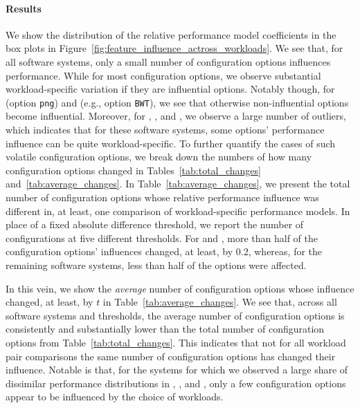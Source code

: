 \paragraph*{Results} 
We show the distribution of the relative performance model coefficients in the box plots in Figure~\ref{fig:feature_influence_actross_workloads}. We see that, for all software systems, only a small number of configuration options influences performance. While for most configuration options, we observe substantial workload-specific variation if they are influential options. Notably though, for \dconvert (option \texttt{png}) and \kanzi (e.g., option \texttt{BWT}), we see that otherwise non-influential options become influential. Moreover, for \batik, \dconvert, and \kanzi, we observe a large number of outliers, which indicates that for these software systems, some options' performance influence can be quite workload-specific.
To further quantify the cases of such volatile configuration options, we break down the numbers of how many configuration options changed in Tables~\ref{tab:total_changes} and~\ref{tab:average_changes}. In Table~\ref{tab:average_changes}, we present the total number of configuration options whose relative performance influence was different in, at least, one comparison of workload-specific performance models. In place of a fixed absolute difference threshold, we report the number of configurations at five different thresholds. For \jumper and \kanzi, more than half of the configuration options' influences changed, at least, by $0.2$, whereas, for the remaining software systems, less than half of the options were affected.

In this vein, we show the \textit{average} number of configuration options whose influence changed, at least, by $t$ in Table~\ref{tab:average_changes}. We see that, across all software systems and thresholds, the average number of configuration options is consistently and substantially lower than the total number of configuration options from Table~\ref{tab:total_changes}. This indicates that not for all workload pair comparisons the same number of configuration options has changed their influence. Notable is that, for the systems for which we observed a large share of dissimilar performance distributions in , \dconvert, and \htwo, only a few configuration options appear to be influenced by the choice of workloads.

